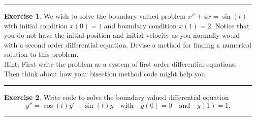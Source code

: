 \documentclass[
]{book}
\theoremstyle{definition}
\theoremstyle{definition}
\theoremstyle{definition}
\newtheorem{exercise}{Exercise}[chapter]
\theoremstyle{remark}
\begin{document}
\begin{center}\rule{0.5\linewidth}{0.5pt}\end{center}

\begin{exercise}
\protect\hypertarget{exr:unnamed-chunk-500}{}{\label{exr:unnamed-chunk-500} }We wish to solve the boundary valued problem \(x'' + 4x = \sin(t)\) with
initial condition \(x(0)=1\) and boundary condition \(x(1)=2\). Notice that
you do not have the initial position and initial velocity as you
normally would with a second order differential equation. Devise a
method for finding a numerical solution to this problem.\\
Hint: First write the problem as a system of first order differential
equations. Then think about how your bisection method code might help
you.
\end{exercise}

\begin{center}\rule{0.5\linewidth}{0.5pt}\end{center}

\begin{exercise}
\protect\hypertarget{exr:unnamed-chunk-501}{}{\label{exr:unnamed-chunk-501} }Write code to solve the boundary valued differential equation
\[y'' = \cos(t) y' + \sin(t) y \quad \text{with} \quad y(0) = 0 \quad \text{and}
        \quad y(1) = 1.\]
\end{exercise}

\begin{center}\rule{0.5\linewidth}{0.5pt}\end{center}
\end{document}

